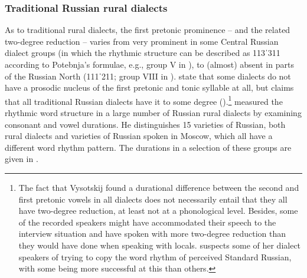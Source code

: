 \documentclass[output=paper]{langscibook}
\begin{document}
\subsubsection{Traditional Russian rural dialects}
\label{sec:post:1.2.2}
As to traditional rural dialects, the first pretonic prominence -- and the related two-degree reduction -- varies from very prominent in some Central Russian dialect groups (in which the rhythmic structure can be described as 113ˈ311 according to Potebnja’s formulae, e.g., group V in ), to (almost) absent in parts of the Russian North (111ˈ211; group VIII in ). \citet{GrammatčikovaPožarickaja2013} state that some dialects do not have a prosodic nucleus of the first pretonic and tonic syllable at all, but \citet{Vysotskij1973} claims that all traditional Russian dialects have it to some degree (\citeyear[34,36]{Vysotskij1973}).\footnote{The fact that Vysotskij found a durational difference between the second and first pretonic vowels in all dialects does not necessarily entail that they all have two-degree reduction, at least not at a phonological level. Besides, some of the recorded speakers might have accommodated their speech to the interview situation and have spoken with more two-degree reduction than they would have done when speaking with locals. \citet{Paufošima1978} suspects some of her dialect speakers of trying to copy the word rhythm of perceived Standard Russian, with some being more successful at this than others.} \citet{Vysotskij1973} measured the rhythmic word structure in a large number of Russian rural dialects by examining consonant and vowel durations. He distinguishes 15 varieties of Russian, both rural dialects and varieties of Russian spoken in Moscow, which all have a different word rhythm pattern. The durations in a selection of these groups are given in .
\end{document}
